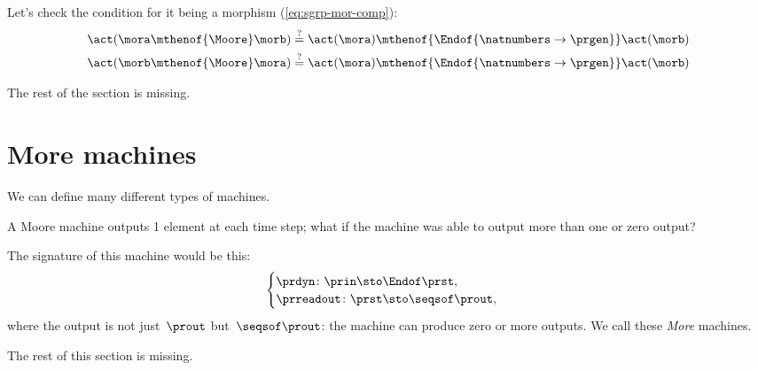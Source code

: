 Let's check the condition for it being a morphism (\cref{eq:sgrp-mor-comp}):
%
\begin{align}
    \act ( \mora \mthenof{\Moore} \morb) & \mathrel{\stackrel{?
    }{=} } \act ( \mora) \mthenof{\Endof  {\natnumbers \to \prgen}} \act(\morb) \label{eq:actions-on-sequences-left}                                                             \\
    \act ( \morb \mthenof{\Moore} \mora) & \mathrel{\stackrel{?}{=}}  \act ( \mora) \mthenof{\Endof  {\natnumbers \to \prgen}} \act(\morb) \label{eq:actions-on-sequences-right}
\end{align}
\begin{publictodo}
    The rest of the section is missing.
\end{publictodo}


\section{More machines}
\label{sec:more-machines}

We can define many different types of machines.

A Moore machine outputs 1 element at each time step; what if the machine was able to output more than one or zero output?

The signature of this machine would be this:
%
\begin{equation}
    \label{eq:more-signature}
    \begin{cases}
        \prdyn \colon  \prin \sto \Endof \prst, \\
        \prreadout \colon \prst \sto \seqsof \prout,
    \end{cases}
\end{equation}
%
where the output is not just~$\prout$ but~$\seqsof \prout$: the machine can produce zero or more outputs.
We call these \emph{More} machines.


\begin{publictodo}
    The rest of this section is missing.
\end{publictodo}

